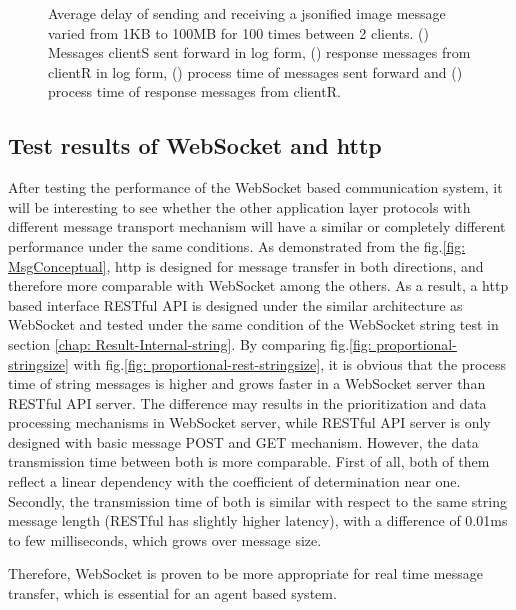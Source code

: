 \begin{figure}[htb]
    \caption{Average delay of sending and receiving a jsonified image message varied from 1KB 
    to 100MB for 100 times between 2 clients. () 
    Messages clientS sent forward in log form, 
    () response messages from clientR in log form, 
    () process time of messages sent forward  
    and () process time of response messages from clientR. 
    \label{fig: proportional-imagesize}}
\end{figure}


\subsection{Test results of WebSocket and \gls{http}} \label{chap: Result-RestFUL_WS}
After testing the performance of the WebSocket based communication system, 
it will be interesting to see whether the other application layer protocols with 
different message transport mechanism will have a similar or completely different 
performance under the same conditions. As demonstrated from the 
fig.\ref{fig: MsgConceptual}, \gls{http} is designed for message 
transfer in both directions, and therefore more comparable with WebSocket among the others. 
As a result, a \gls{http} based interface RESTful API is designed under the similar architecture 
as WebSocket and tested under the same condition of the WebSocket string test in 
section \ref{chap: Result-Internal-string}. By comparing 
fig.\ref{fig: proportional-stringsize} with fig.\ref{fig: proportional-rest-stringsize}, 
it is obvious that the process time of string messages is higher and 
grows faster in a WebSocket server than RESTful API server. The difference may 
results in the prioritization and data processing mechanisms in WebSocket server, 
while RESTful API server is only designed with basic message POST and GET 
mechanism. However, the data transmission time between both is more comparable. 
First of all, both of them reflect a linear dependency with the coefficient 
of determination near one. Secondly, the transmission time of both is similar 
with respect to the same string message length (RESTful has slightly higher latency), 
with a difference of 0.01ms to few milliseconds, which grows over 
message size.   

Therefore, WebSocket is proven to be more appropriate for real time message 
transfer, which is essential for an agent based system.


